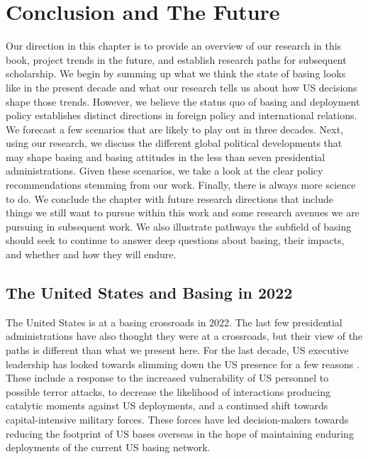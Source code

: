 \chapter{Conclusion and The Future \label{cha:conclusion}}



Our direction in this chapter is to provide an overview of our research in this book, project trends in the future, and establish research paths for subsequent scholarship. We begin by summing up what we think the state of basing looks like in the present decade and what our research tells us about how US decisions shape those trends. However, we believe the status quo of basing and deployment policy establishes distinct directions in foreign policy and international relations. We forecast a few scenarios that are likely to play out in three decades. Next, using our research, we discuss the different global political developments that may shape basing and basing attitudes in the less than seven presidential administrations. Given these scenarios, we take a look at the clear policy recommendations stemming from our work. Finally, there is always more science to do. We conclude the chapter with future research directions that include things we still want to pursue within this work and some research avenues we are pursuing in subsequent work. We also illustrate pathways the subfield of basing should seek to continue to answer deep questions about basing, their impacts, and whether and how they will endure. 

\section*{The United States and Basing in 2022}

The United States is at a basing crossroads in 2022. The last few presidential administrations have also thought they were at a crossroads, but their view of the paths is different than what we present here. For the last decade, US executive leadership has looked towards slimming down the US presence for a few reasons \cite{Woody2021}. These include a response to the increased vulnerability of US personnel to possible terror attacks, to decrease the likelihood of interactions producing catalytic moments against US deployments, and a continued shift towards capital-intensive military forces. These forces have led decision-makers towards reducing the footprint of US bases overseas in the hope of maintaining enduring deployments of the current US basing network. 

